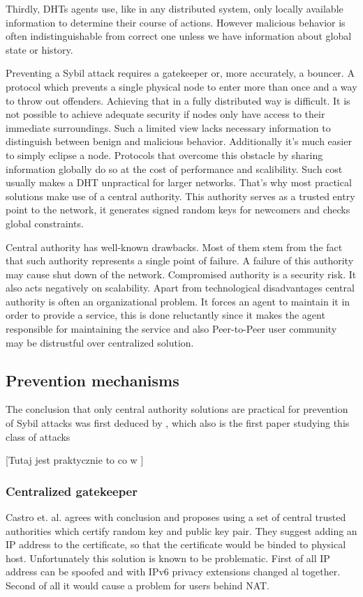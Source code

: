   Thirdly, DHTs agents use, like in any distributed system, only locally
  available information to determine their course of actions. However malicious
  behavior is often indistinguishable from correct one unless we have
  information about global state or history.

  Preventing a Sybil attack requires a gatekeeper or, more accurately, a
  bouncer. A protocol which prevents a single physical node to enter more than
  once and a way to throw out offenders. Achieving that in a fully distributed
  way is difficult. It is not possible to achieve adequate security if nodes
  only have access to their immediate surroundings. Such a limited view lacks
  necessary information to distinguish between benign and malicious behavior.
  Additionally it's much easier to simply eclipse a node. Protocols that
  overcome this obstacle by sharing information globally do so at the cost of
  performance and scalibility. Such cost usually makes a DHT unpractical for
  larger networks. That's why most practical solutions make use of a central
  authority. This authority serves as a trusted entry point to the network, it
  generates signed random keys for newcomers and checks global constraints.

  Central authority has well-known drawbacks. Most of them stem from the fact
  that such authority represents a single point of failure. A failure of this
  authority may cause shut down of the network. Compromised authority is a
  security risk. It also acts negatively on scalability. Apart from
  technological disadvantages central authority is often an organizational
  problem. It forces an agent to maintain it in order to provide a service, this
  is done reluctantly since it makes the agent responsible for maintaining the
  service and also Peer-to-Peer user community may be distrustful over
  centralized solution.

\subsection{Prevention mechanisms}

  The conclusion that only central authority solutions are practical for
  prevention of Sybil attacks was first deduced by \cite{dou02}, which also is
  the first paper studying this class of attacks \cite[p. 5]{urd11}

  [Tutaj jest praktycznie to co w \cite{urd11}]
  \subsubsection{Centralized gatekeeper}
  Castro et. al. \cite{cas02} agrees with \cite{dou02} conclusion and proposes
  using a set of central trusted authorities which certify random key and public
  key pair. They suggest adding an IP address to the certificate, so that the
  certificate would be binded to physical host. Unfortunately this solution is
  known to be problematic. First of all IP address can be spoofed and with IPv6
  privacy extensions changed al together. Second of all it would cause a problem
  for users behind NAT.

